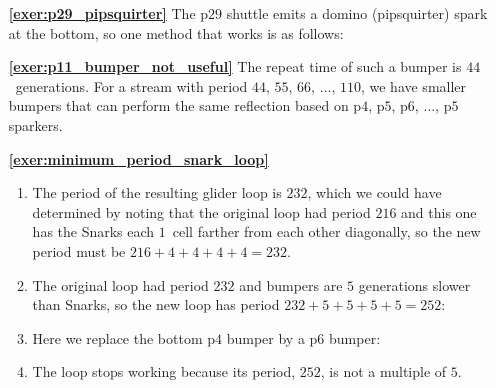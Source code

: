 \begin{multicols}{2}
\begin{itemize}[leftmargin=0em]
		\item[\bf\color{ocre}\sffamily\ref{exer:p29_pipsquirter}] The p$29$ shuttle emits a domino (pipsquirter) spark at the bottom, so one method that works is as follows:
		
		\begin{center}
		\end{center}
	

		\item[\bf\color{ocre}\sffamily\ref{exer:p11_bumper_not_useful}] The repeat time of such a bumper is $44$~generations. For a stream with period $44$, $55$, $66$, $\ldots$, $110$, we have smaller bumpers that can perform the same reflection based on p$4$, p$5$, p$6$, $\ldots$, p$5$ sparkers.
		
		
		\item[\bf\color{ocre}\sffamily\ref{exer:minimum_period_snark_loop}]
		\begin{enumerate}[leftmargin=1.5em,label=\bf\color{ocre}(\alph*)]
			\item The period of the resulting glider loop is $232$, which we could have determined by noting that the original loop had period $216$ and this one has the Snarks each $1$~cell farther from each other diagonally, so the new period must be $216+4+4+4+4 = 232$.
			
			\noindent\begin{center}
			\end{center}
			
			\item The original loop had period $232$ and bumpers are $5$ generations slower than Snarks, so the new loop has period $232+5+5+5+5 = 252$:
			
			\noindent\begin{center}
			\end{center}
			
			\item Here we replace the bottom p$4$ bumper by a p$6$ bumper:
			
			\noindent\begin{center}
			\end{center}
			
			\item The loop stops working because its period, $252$, is not a multiple of $5$.
			

\end{enumerate}
\end{itemize}
\end{multicols}
